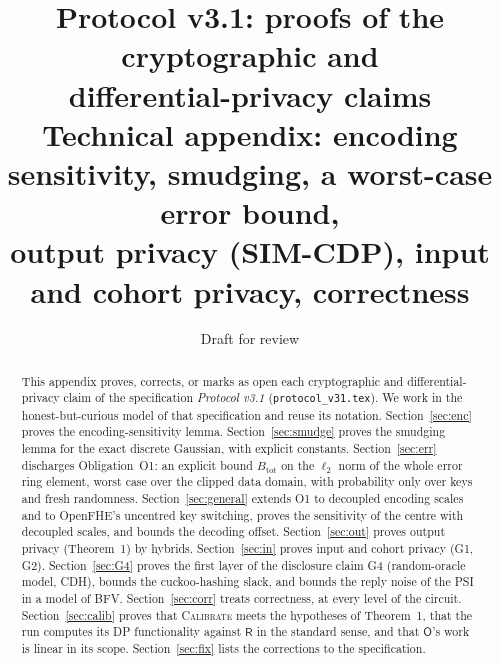 \documentclass[11pt]{article}
\title{\textbf{Protocol v3.1: proofs of the cryptographic and\\ differential-privacy claims}\\[4pt]
\large Technical appendix: encoding sensitivity, smudging, a worst-case error bound,\\ output privacy (SIM-CDP), input and cohort privacy, correctness}
\date{Draft for review}
\theoremstyle{definition}
\theoremstyle{plain}
\newcommand{\Rp}{\mathsf{R}}
\newcommand{\Op}{\mathsf{O}}
\newcommand{\Btot}{B_{\mathrm{tot}}}
\begin{document}
\maketitle

\begin{abstract}
\noindent
This appendix proves, corrects, or marks as open each cryptographic and differential-privacy claim of the specification \emph{Protocol v3.1} (\texttt{protocol\_v31.tex}). We work in the honest-but-curious model of that specification and reuse its notation. Section~\ref{sec:enc} proves the encoding-sensitivity lemma. Section~\ref{sec:smudge} proves the smudging lemma for the exact discrete Gaussian, with explicit constants. Section~\ref{sec:err} discharges Obligation~O1: an explicit bound $\Btot$ on the $\ell_2$ norm of the whole error ring element, worst case over the clipped data domain, with probability only over keys and fresh randomness. Section~\ref{sec:general} extends O1 to decoupled encoding scales and to OpenFHE's uncentred key switching, proves the sensitivity of the centre with decoupled scales, and bounds the decoding offset. Section~\ref{sec:out} proves output privacy (Theorem~1) by hybrids. Section~\ref{sec:in} proves input and cohort privacy (G1, G2). Section~\ref{sec:G4} proves the first layer of the disclosure claim G4 (random-oracle model, CDH), bounds the cuckoo-hashing slack, and bounds the reply noise of the PSI in a model of BFV. Section~\ref{sec:corr} treats correctness, at every level of the circuit. Section~\ref{sec:calib} proves that \textsc{Calibrate} meets the hypotheses of Theorem~1, that the run computes its DP functionality against $\Rp$ in the standard sense, and that $\Op$'s work is linear in its scope. Section~\ref{sec:fix} lists the corrections to the specification.
\end{abstract}
\end{document}
